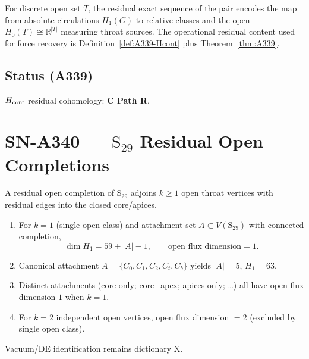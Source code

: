 \begin{remark}
For discrete open set $T$, the residual exact sequence of the pair encodes the map from absolute circulations $H_1(G)$ to relative classes and the open $H_0(T)\cong\mathbb{R}^{|T|}$ measuring throat sources. The operational residual content used for force recovery is Definition~\ref{def:A339-Hcont} plus Theorem~\ref{thm:A339}.
\end{remark}

\subsection*{Status (A339)}
$H_{\rm cont}$ residual cohomology: \textbf{C Path R}.

\section{SN-A340 --- $\mathrm{S}_{29}$ Residual Open Completions}
\label{sec:SN-A340}

\begin{definition}
\label{def:A340-comp}
A residual open completion of $\mathrm{S}_{29}$ adjoins $k\ge 1$ open throat vertices with residual edges into the closed core/apices.
\end{definition}

\begin{theorem}
\label{thm:A340}
\begin{enumerate}[label=(\roman*)]
\item For $k=1$ (single open class) and attachment set $A\subset V(\mathrm{S}_{29})$ with connected completion,
\begin{equation}
\dim H_1 = 59+|A|-1,
\qquad
\text{open flux dimension}=1.
\end{equation}
\item Canonical attachment $A=\{C_0,C_1,C_2,C_t,C_b\}$ yields $|A|=5$, $H_1=63$.
\item Distinct attachments (core only; core+apex; apices only; \ldots) all have open flux dimension $1$ when $k=1$.
\item For $k=2$ independent open vertices, open flux dimension $=2$ (excluded by single open class).
\end{enumerate}
Vacuum/DE identification remains dictionary X.
\end{theorem}

